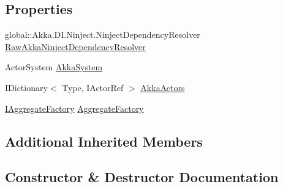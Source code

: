 \subsection*{Properties}
\begin{DoxyCompactItemize}
\item 
global\+::\+Akka.\+D\+I.\+Ninject.\+Ninject\+Dependency\+Resolver \hyperlink{classCqrs_1_1Ninject_1_1Akka_1_1AkkaNinjectDependencyResolver_a08c93ce2f3f66affd8753eb3d3de1211_a08c93ce2f3f66affd8753eb3d3de1211}{Raw\+Akka\+Ninject\+Dependency\+Resolver}
\item 
Actor\+System \hyperlink{classCqrs_1_1Ninject_1_1Akka_1_1AkkaNinjectDependencyResolver_a3de5415a68020e868579491453621f64_a3de5415a68020e868579491453621f64}{Akka\+System}
\item 
I\+Dictionary$<$ Type, I\+Actor\+Ref $>$ \hyperlink{classCqrs_1_1Ninject_1_1Akka_1_1AkkaNinjectDependencyResolver_acfe6512df9f871fa148fbf0866b3ba52_acfe6512df9f871fa148fbf0866b3ba52}{Akka\+Actors}
\item 
\hyperlink{interfaceCqrs_1_1Domain_1_1Factories_1_1IAggregateFactory}{I\+Aggregate\+Factory} \hyperlink{classCqrs_1_1Ninject_1_1Akka_1_1AkkaNinjectDependencyResolver_afc2288a9aac598943df2a995b660d859_afc2288a9aac598943df2a995b660d859}{Aggregate\+Factory}
\end{DoxyCompactItemize}
\subsection*{Additional Inherited Members}


\subsection{Constructor \& Destructor Documentation}
\mbox{\label{classCqrs_1_1Ninject_1_1Akka_1_1AkkaNinjectDependencyResolver_a7fdff6e54ac903d86bb79bf5536f8820_a7fdff6e54ac903d86bb79bf5536f8820}} 
